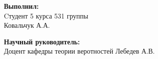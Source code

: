 \begin{titlepage}
\begin{minipage}[t]{0.47\textwidth}
	{\large{\textbf{Выполнил:}}{\normalsize\vspace{3mm}
	\\ \large{Cтудент 5 курса 531 группы \\ Ковальчук А.А.} \normalsize\vspace{3mm}}}
\end{minipage}
\hfill
\begin{minipage}[t]{0.47\textwidth}\raggedleft
	{\large{\textbf{Научный руководитель:}}{\normalsize\vspace{3mm} 
	\\ \large{Доцент кафедры теории веротностей Лебедев А.В.}}}
\end{minipage}

\vspace{20mm}
\hrulefill
\\

\end{titlepage}